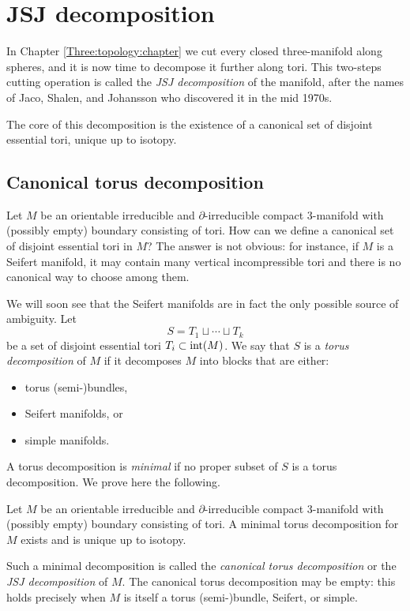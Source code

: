 \section{JSJ decomposition}
In Chapter \ref{Three:topology:chapter} we cut every closed three-manifold along spheres, and it is now time to decompose it further along tori. 
This two-steps cutting operation is called the \emph{JSJ decomposition} of the manifold, after the names of Jaco, Shalen, and Johansson who discovered it in the mid 1970s.

The core of this decomposition is the existence of a canonical set of disjoint essential tori, unique up to isotopy. 

\subsection{Canonical torus decomposition}
Let $M$ be an orientable irreducible and $\partial$-irreducible compact 3-manifold with (possibly empty) boundary consisting of tori. How can we define a canonical set of disjoint essential tori in $M$? The answer is not obvious: for instance, if $M$ is a Seifert manifold, it may contain many vertical incompressible tori and there is no canonical way to choose among them.

We will soon see that the Seifert manifolds are in fact the only possible source of ambiguity. Let
$$S=T_1\sqcup \cdots \sqcup T_k$$ 
be a set of disjoint essential tori $T_i\subset {\rm int}(M)$. 
We say that $S$ is a \emph{torus decomposition} of $M$ if it decomposes $M$ into blocks that are either: 
\begin{itemize}
\item torus (semi-)bundles,
\item Seifert manifolds, or
\item simple manifolds.
\end{itemize}

A torus decomposition is \emph{minimal} if no proper subset of $S$ is a torus decomposition. We prove here the following.

\begin{teo} \label{JSJ:teo}
Let  $M$ be an orientable irreducible and $\partial$-irreducible compact 3-manifold with (possibly empty) boundary consisting of tori. A minimal torus decomposition for $M$ exists and is unique up to isotopy.
\end{teo}

Such a minimal decomposition is called the \emph{canonical torus decomposition} or the \emph{JSJ decomposition} of $M$. The canonical torus decomposition may be empty: this holds precisely when $M$ is itself a torus (semi-)bundle, Seifert, or simple.

